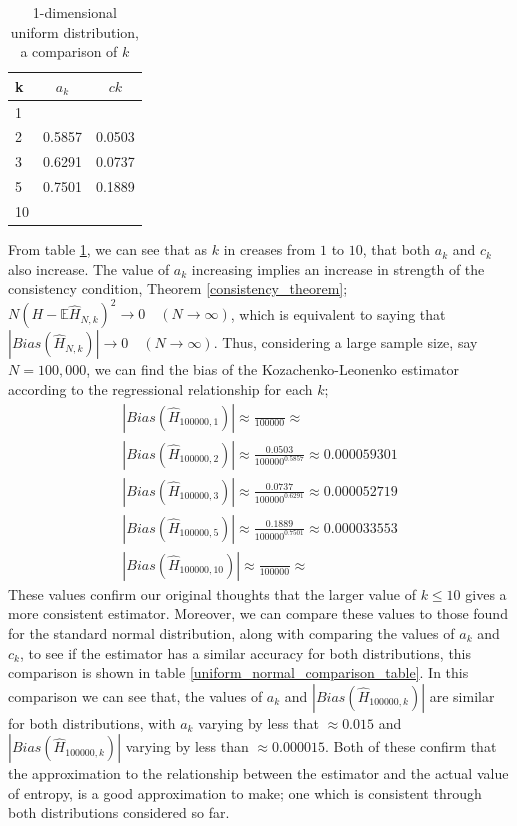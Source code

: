 \documentclass{article}
\begin{document}
\begin{table}
\caption{1-dimensional uniform distribution, a comparison of $k$} \label{uniform_k_comparison_table}
\begin{center}
\begin{tabular}{| l | c c|} 
\toprule
k & $a_{k}$ & $c{k}$ \\
\midrule[1pt]
1 & & \\
2 & 0.5857 & 0.0503 \\
3 & 0.6291 & 0.0737 \\
5 & 0.7501 & 0.1889 \\
10 & & \\
\hline
\end{tabular}
\end{center}
\end{table}

From table \ref{uniform_k_comparison_table}, we can see that as $k$ in creases from $1$ to $10$, that both $a_{k}$ and $c_{k}$ also increase. The value of $a_{k}$ increasing implies an increase in strength of the consistency condition, Theorem \ref{consistency_theorem};  $N (H - \mathbb{E}{\hat{H}_{N, k}})^2 \to 0 \quad  (N \to \infty)$, which is equivalent to saying that $|Bias(\hat{H}_{N, k})| \to 0 \quad (N \to \infty)$. Thus, considering a large sample size, say $N=100,000$, we can find the bias of the Kozachenko-Leonenko estimator according to the regressional relationship for each $k$;
\begin{gather*}
|Bias(\hat{H}_{100000, 1})| \approx  \frac{}{100000^{}}   \approx  \\
|Bias(\hat{H}_{100000, 2})| \approx  \frac{0.0503}{100000^{0.5857}}   \approx 0.000059301 \\
|Bias(\hat{H}_{100000, 3})| \approx  \frac{0.0737}{100000^{0.6291}}   \approx 0.000052719 \\
|Bias(\hat{H}_{100000, 5})| \approx  \frac{0.1889}{100000^{0.7501}}   \approx 0.000033553\\
|Bias(\hat{H}_{100000, 10})| \approx  \frac{}{100000^{}}   \approx  
\end{gather*}
These values confirm our original thoughts that the larger value of $k \leq 10$ gives a more consistent estimator. Moreover, we can compare these values to those found for the standard normal distribution, along with comparing the values of $a_{k}$ and $c_{k}$, to see if the estimator has a similar accuracy for both distributions, this comparison is shown in table \ref{uniform_normal_comparison_table}.
In this comparison we can see that, the values of $a_{k}$ and $|Bias(\hat{H}_{100000, k})|$ are similar for both distributions, with $a_{k}$ varying by less that $\approx 0.015$ and $|Bias(\hat{H}_{100000, k})|$ varying by less than $\approx 0.000015$. Both of these confirm that the approximation to the relationship between the estimator and the actual value of entropy, is a good approximation to make; one which is consistent through both distributions considered so far.
\end{document}
